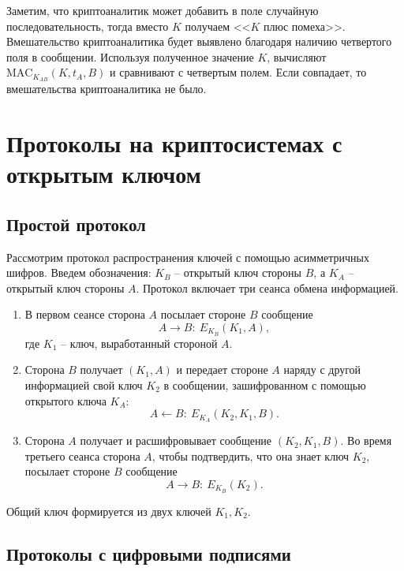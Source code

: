 \documentclass[10pt,a4paper]{book}
\newcommand{\MAC}{\textrm{MAC}}
\begin{document}
Заметим, что криптоаналитик может добавить в поле случайную последовательность, тогда вместо $K$ получаем <<$K$ плюс помеха>>. Вмешательство криптоаналитика будет выявлено благодаря наличию четвертого поля в сообщении. Используя полученное значение $K$, вычисляют $\MAC_{K_{AB}}(K, t_A, B)$ и сравнивают с четвертым полем. Если совпадает, то вмешательства криптоаналитика не было.



\section{Протоколы на криптосистемах с открытым ключом}

\subsection{Простой протокол}

Рассмотрим протокол распространения ключей с помощью асимметричных шифров. Введем обозначения: $K_B$ -- открытый ключ стороны $B$, а $K_A$ -- открытый ключ стороны $A$. Протокол включает три сеанса обмена информацией.
\begin{enumerate}
    \item В первом сеансе сторона $A$ посылает стороне $B$ сообщение
            \[ A \rightarrow B: ~ E_{K_B}(K_1, A), \]
        где $K_1$ -- ключ, выработанный стороной $A$.
    \item Сторона $B$ получает $(K_1, A)$ и передает стороне $A$ наряду с другой информацией свой ключ $K_2$ в сообщении, зашифрованном с помощью открытого ключа $K_A$:
            \[ A \leftarrow B: ~ E_{K_A}(K_2, K_1, B). \]
    \item Сторона $A$ получает и расшифровывает сообщение $(K_2, K_1, B)$. Во время третьего сеанса сторона $A$, чтобы подтвердить, что она знает ключ $K_2$, посылает стороне $B$ сообщение
            \[ A \rightarrow B: ~ E_{K_B}(K_2). \]
\end{enumerate}
Общий ключ формируется из двух ключей $K_1, K_2$.

\subsection{Протоколы с цифровыми подписями}
\end{document}
